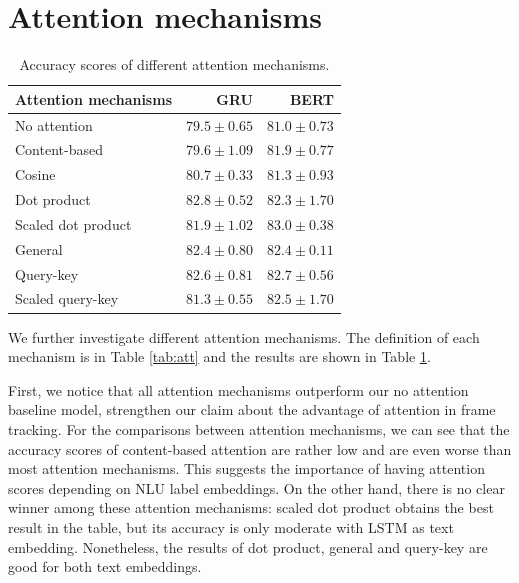 

\section{Attention mechanisms} \label{sec:att}
\begin{table}
    \centering
    \caption[Accuracy scores of different attention mechanisms]{Accuracy scores of different attention mechanisms.}
    \label{tab:att-res}
    \begin{tabular}[t]{lrr}
        \toprule
        Attention mechanisms & GRU & BERT \\
        \midrule
        No attention & $79.5 \pm 0.65$ & $81.0 \pm 0.73$ \\
        Content-based & $79.6 \pm 1.09$ & $81.9 \pm 0.77$ \\
        Cosine & $80.7 \pm 0.33$ & $81.3 \pm 0.93$ \\
        Dot product & $\bm{82.8 \pm 0.52}$ & $82.3 \pm 1.70$ \\
        Scaled dot product & $81.9 \pm 1.02$ & $\bm{83.0 \pm 0.38}$ \\
        General & $82.4 \pm 0.80$ & $82.4 \pm 0.11$ \\
        Query-key & $82.6 \pm 0.81$ & $82.7 \pm 0.56$ \\
        Scaled query-key & $81.3 \pm 0.55$ & $82.5 \pm 1.70$ \\
        \bottomrule
    \end{tabular}
\end{table}

We further investigate different attention mechanisms. The definition of each mechanism is in Table \ref{tab:att} and the results are shown in Table \ref{tab:att-res}.

First, we notice that all attention mechanisms outperform our no attention baseline model, strengthen our claim about the advantage of attention in frame tracking.
For the comparisons between attention mechanisms, we can see that the accuracy scores of content-based attention are rather low and are even worse than most attention mechanisms. This suggests the importance of having attention scores depending on NLU label embeddings.
On the other hand, there is no clear winner among these attention mechanisms: scaled dot product obtains the best result in the table, but its accuracy is only moderate with LSTM as text embedding.
Nonetheless, the results of dot product, general and query-key are good for both text embeddings.


